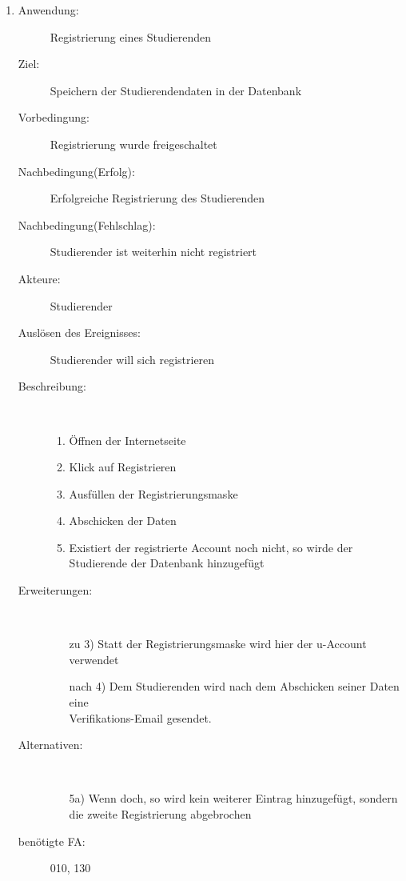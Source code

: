 \documentclass[parskip=full]{scrartcl}
\newcommand{\swtLabel}[1]{\textbf{\textbackslash #1\arabic*0\textbackslash}}
\begin{document}
\begin{enumerate}[label=\swtLabel{S}]
	\item
    \begin{description}
  	\item[Anwendung:] Registrierung eines Studierenden
  	\item[Ziel:] Speichern der Studierendendaten in der Datenbank
  	\item[Vorbedingung:] Registrierung wurde freigeschaltet
  	\item[Nachbedingung(Erfolg):] Erfolgreiche Registrierung des Studierenden
  	\item[Nachbedingung(Fehlschlag):] Studierender ist weiterhin nicht
  	registriert
  	\item[Akteure:] Studierender
  	\item[Auslösen des Ereignisses:] Studierender will sich registrieren
  	\item[Beschreibung:]~
  	\begin{enumerate}
  	  \item Öffnen der Internetseite
      \item Klick auf Registrieren
      \item Ausfüllen der Registrierungsmaske
      \item Abschicken der Daten
      \item Existiert der registrierte Account noch nicht, so wirde der Studierende
      der Datenbank hinzugefügt
  	\end{enumerate}
  	\item[Erweiterungen:]~
  	\begin{enumerate}
  	  \item[zu 3)] Statt der Registrierungsmaske wird hier der u-Account
  	  verwendet
  	  \item[nach 4)] Dem Studierenden wird nach dem Abschicken seiner Daten eine
  	  \\
  	  Verifikations-Email gesendet.
  	 \end{enumerate} 
  	\item[Alternativen:]~
  	\begin{enumerate}
  	  \item[5a)] Wenn doch, so wird kein weiterer Eintrag hinzugefügt, sondern
  	  die zweite Registrierung abgebrochen
  	\end{enumerate} 
  	\item[benötigte FA:] 010, 130
  \end{description}
%   
  

\end{enumerate}
\end{document}
